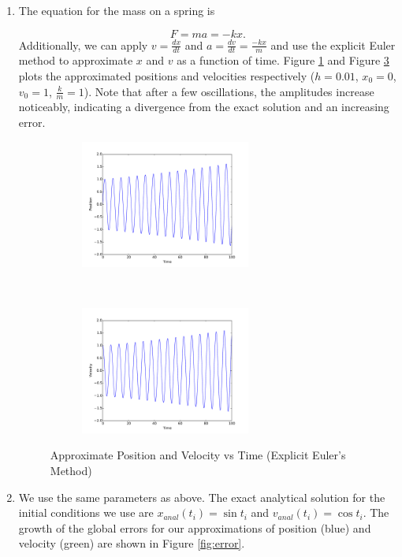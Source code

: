 \documentclass{article}
\begin{document}
\begin{enumerate}
	\item The equation for the mass on a spring is
	
	\begin{equation}
		F = ma = -kx.
	\end{equation}
	Additionally, we can apply $v = \frac{dx}{dt}$ and $a = \frac{dv}{dt} = \frac{-kx}{m}$ and use the explicit Euler method to approximate $x$ and $v$ as a function of time. Figure \ref{fig:x_exp} and Figure \ref{fig:v_exp} plots the approximated positions and velocities respectively ($h = 0.01$, $x_0 = 0$, $v_0 = 1$, $\frac{k}{m} = 1$). Note that after a few oscillations, the amplitudes increase noticeably, indicating a divergence from the exact solution and an increasing error.
	
	\begin{figure}[ht!]
		\centering
		\begin{subfigure}{0.4\textwidth}
		\includegraphics[width=2.2in]{position.pdf}
		\caption{}
		\label{fig:x_exp}
		\end{subfigure}
		~
		\begin{subfigure}{0.4\textwidth}
		\centering
		\includegraphics[width=2.2in]{v.pdf}
		\caption{}
		\label{fig:v_exp}
		\end{subfigure}
		\caption{Approximate Position and Velocity vs Time (Explicit Euler's Method)}
	\end{figure}
	
	\item We use the same parameters as above. The exact analytical solution for the initial conditions we use are $x_{anal}(t_i) = \sin t_i$ and $v_{anal}(t_i) = \cos t_i$. The growth of the global errors for our approximations of position (blue) and velocity (green) are shown in Figure \ref{fig:error}.
	

\end{enumerate}
\end{document}
